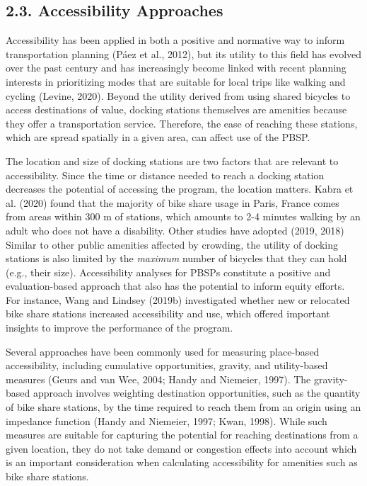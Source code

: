 \documentclass[]{elsarticle} %
\begin{document}
\hypertarget{accessibility-approaches}{%
\subsection{2.3. Accessibility
Approaches}\label{accessibility-approaches}}

Accessibility has been applied in both a positive and normative way to
inform transportation planning (Páez et al., 2012), but its utility to
this field has evolved over the past century and has increasingly become
linked with recent planning interests in prioritizing modes that are
suitable for local trips like walking and cycling (Levine, 2020). Beyond
the utility derived from using shared bicycles to access destinations of
value, docking stations themselves are amenities because they offer a
transportation service. Therefore, the ease of reaching these stations,
which are spread spatially in a given area, can affect use of the PBSP.

The location and size of docking stations are two factors that are
relevant to accessibility. Since the time or distance needed to reach a
docking station decreases the potential of accessing the program, the
location matters. Kabra et al. (2020) found that the majority of bike
share usage in Paris, France comes from areas within 300 m of stations,
which amounts to 2-4 minutes walking by an adult who does not have a
disability. Other studies have adopted (2019, 2018) Similar to other
public amenities affected by crowding, the utility of docking stations
is also limited by the \emph{maximum} number of bicycles that they can
hold (e.g., their size). Accessibility analyses for PBSPs constitute a
positive and evaluation-based approach that also has the potential to
inform equity efforts. For instance, Wang and Lindsey (2019b)
investigated whether new or relocated bike share stations increased
accessibility and use, which offered important insights to improve the
performance of the program.

Several approaches have been commonly used for measuring place-based
accessibility, including cumulative opportunities, gravity, and
utility-based measures (Geurs and van Wee, 2004; Handy and Niemeier,
1997). The gravity-based approach involves weighting destination
opportunities, such as the quantity of bike share stations, by the time
required to reach them from an origin using an impedance function (Handy
and Niemeier, 1997; Kwan, 1998). While such measures are suitable for
capturing the potential for reaching destinations from a given location,
they do not take demand or congestion effects into account which is an
important consideration when calculating accessibility for amenities
such as bike share stations.
\end{document}
